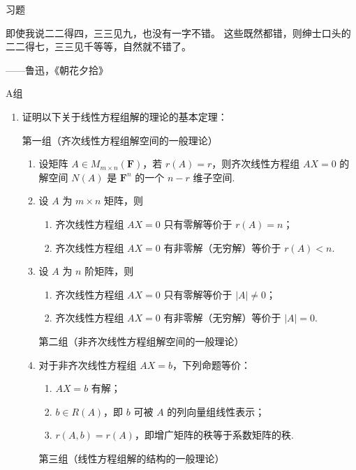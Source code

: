\centerline{\heiti \Large 习题}
\vspace{2ex}
{\kaishu 即使我说二二得四，三三见九，也没有一字不错。
这些既然都错，则绅士口头的二二得七，三三见千等等，自然就不错了。}
\begin{flushright}
    \kaishu
    ——鲁迅，《朝花夕拾》
\end{flushright}
\centerline{\heiti A组}
\begin{enumerate}
    \item 证明以下关于线性方程组解的理论的基本定理：

    第一组（齐次线性方程组解空间的一般理论）
    \begin{enumerate}
        \item 设矩阵 $A \in M_{m\times n}(\mathbf{F})$，若 $r(A)=r$，则齐次线性方程组 $AX=0$ 的解空间 $N(A)$ 是 $\mathbf{F}^n$ 的一个 $n-r$ 维子空间.
        
        \item 设 $A$ 为 $m \times n$ 矩阵，则
        \begin{enumerate}[label=(\arabic*)]
            \item 齐次线性方程组 $AX=0$ 只有零解等价于 $r(A)=n$；
            \item 齐次线性方程组 $AX=0$ 有非零解（无穷解）等价于 $r(A)<n$.
        \end{enumerate}
        
        \item 设 $A$ 为 $n$ 阶矩阵，则
        \begin{enumerate}[label=(\arabic*)]
            \item 齐次线性方程组 $AX=0$ 只有零解等价于 $|A|\neq 0$；
            \item 齐次线性方程组 $AX=0$ 有非零解（无穷解）等价于 $|A|=0$.
        \end{enumerate}

    第二组（非齐次线性方程组解空间的一般理论）
        
        \item 对于非齐次线性方程组 $AX=b$，下列命题等价：
        \begin{enumerate}[label=(\arabic*)]
            \item $AX=b$ 有解；
            \item $b \in R(A)$，即 $b$ 可被 $A$ 的列向量组线性表示；
            \item $r(A,b)=r(A)$，即增广矩阵的秩等于系数矩阵的秩.
        \end{enumerate}
        
    第三组（线性方程组解的结构的一般理论）
        

\end{enumerate}
\end{enumerate}
